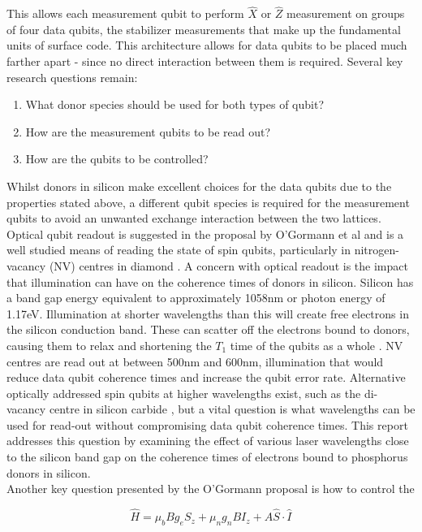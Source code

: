 This allows each measurement qubit to perform $\hat{X}$ or $\hat{Z}$ measurement on groups of four data qubits, the stabilizer measurements that make up the fundamental units of surface code.
This architecture allows for data qubits to be placed much farther apart - since no direct interaction between them is required.
Several key research questions remain:
\begin{enumerate}
	\item{What donor species should be used for both types of qubit?}
	\item{How are the measurement qubits to be read out?}
	\item{How are the qubits to be controlled?}
\end{enumerate}
Whilst donors in silicon make excellent choices for the data qubits due to the properties stated above, a different qubit species is required for the measurement qubits to avoid an unwanted exchange interaction between the two lattices.
Optical qubit readout is suggested in the proposal by O'Gormann et al and is a well studied means of reading the state of spin qubits, particularly in nitrogen-vacancy (NV) centres in diamond \cite{Liu2017}.
A concern with optical readout is the impact that illumination can have on the coherence times of donors in silicon. 
Silicon has a band gap energy equivalent to approximately 1058nm or photon energy of 1.17eV. 
Illumination at shorter wavelengths than this will create free electrons in the silicon conduction band.
These can scatter off the electrons bound to donors, causing them to relax and shortening the $T_1$ time of the qubits as a whole \cite{Ross2017}.  
NV centres are read out at between 500nm and 600nm, illumination that would reduce data qubit coherence times and increase the qubit error rate. 
Alternative optically addressed spin qubits at higher wavelengths exist, such as the di-vacancy centre in silicon carbide \cite{Christle2014}, but a vital question is what wavelengths can be used for read-out without compromising data qubit coherence times.
This report addresses this question by examining the effect of various laser wavelengths close to the silicon band gap on the coherence times of electrons bound to phosphorus donors in silicon.
\\
Another key question presented by the O'Gormann proposal is how to control the 

\begin{equation}
\hat{H} = \mu_bBg_eS_z + \mu_ng_nBI_z + A \hat{S}\cdot\hat{I}
\end{equation}


